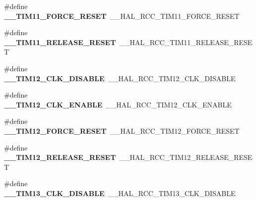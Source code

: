 \begin{DoxyCompactItemize}
\item 
\#define {\bfseries \+\_\+\+\_\+\+T\+I\+M11\+\_\+\+F\+O\+R\+C\+E\+\_\+\+R\+E\+S\+ET}~\+\_\+\+\_\+\+H\+A\+L\+\_\+\+R\+C\+C\+\_\+\+T\+I\+M11\+\_\+\+F\+O\+R\+C\+E\+\_\+\+R\+E\+S\+ET\hypertarget{group___h_a_l___r_c_c___aliased_gabd9681b9a7bba79cd54826cce394f45a}{}\label{group___h_a_l___r_c_c___aliased_gabd9681b9a7bba79cd54826cce394f45a}

\item 
\#define {\bfseries \+\_\+\+\_\+\+T\+I\+M11\+\_\+\+R\+E\+L\+E\+A\+S\+E\+\_\+\+R\+E\+S\+ET}~\+\_\+\+\_\+\+H\+A\+L\+\_\+\+R\+C\+C\+\_\+\+T\+I\+M11\+\_\+\+R\+E\+L\+E\+A\+S\+E\+\_\+\+R\+E\+S\+ET\hypertarget{group___h_a_l___r_c_c___aliased_ga824e2559156eae3f0a571246d3698431}{}\label{group___h_a_l___r_c_c___aliased_ga824e2559156eae3f0a571246d3698431}

\item 
\#define {\bfseries \+\_\+\+\_\+\+T\+I\+M12\+\_\+\+C\+L\+K\+\_\+\+D\+I\+S\+A\+B\+LE}~\+\_\+\+\_\+\+H\+A\+L\+\_\+\+R\+C\+C\+\_\+\+T\+I\+M12\+\_\+\+C\+L\+K\+\_\+\+D\+I\+S\+A\+B\+LE\hypertarget{group___h_a_l___r_c_c___aliased_gab8ee1eb9468f1037ae0b82dae47b4e36}{}\label{group___h_a_l___r_c_c___aliased_gab8ee1eb9468f1037ae0b82dae47b4e36}

\item 
\#define {\bfseries \+\_\+\+\_\+\+T\+I\+M12\+\_\+\+C\+L\+K\+\_\+\+E\+N\+A\+B\+LE}~\+\_\+\+\_\+\+H\+A\+L\+\_\+\+R\+C\+C\+\_\+\+T\+I\+M12\+\_\+\+C\+L\+K\+\_\+\+E\+N\+A\+B\+LE\hypertarget{group___h_a_l___r_c_c___aliased_gaa238e8a1840193501450360652992b0a}{}\label{group___h_a_l___r_c_c___aliased_gaa238e8a1840193501450360652992b0a}

\item 
\#define {\bfseries \+\_\+\+\_\+\+T\+I\+M12\+\_\+\+F\+O\+R\+C\+E\+\_\+\+R\+E\+S\+ET}~\+\_\+\+\_\+\+H\+A\+L\+\_\+\+R\+C\+C\+\_\+\+T\+I\+M12\+\_\+\+F\+O\+R\+C\+E\+\_\+\+R\+E\+S\+ET\hypertarget{group___h_a_l___r_c_c___aliased_gae56b393a7c3f23192414bb515d3e0ce7}{}\label{group___h_a_l___r_c_c___aliased_gae56b393a7c3f23192414bb515d3e0ce7}

\item 
\#define {\bfseries \+\_\+\+\_\+\+T\+I\+M12\+\_\+\+R\+E\+L\+E\+A\+S\+E\+\_\+\+R\+E\+S\+ET}~\+\_\+\+\_\+\+H\+A\+L\+\_\+\+R\+C\+C\+\_\+\+T\+I\+M12\+\_\+\+R\+E\+L\+E\+A\+S\+E\+\_\+\+R\+E\+S\+ET\hypertarget{group___h_a_l___r_c_c___aliased_gab3ad7993389232812fa3634cb8f7909f}{}\label{group___h_a_l___r_c_c___aliased_gab3ad7993389232812fa3634cb8f7909f}

\item 
\#define {\bfseries \+\_\+\+\_\+\+T\+I\+M13\+\_\+\+C\+L\+K\+\_\+\+D\+I\+S\+A\+B\+LE}~\+\_\+\+\_\+\+H\+A\+L\+\_\+\+R\+C\+C\+\_\+\+T\+I\+M13\+\_\+\+C\+L\+K\+\_\+\+D\+I\+S\+A\+B\+LE\hypertarget{group___h_a_l___r_c_c___aliased_gacfec356657ad501040bd9429cbdaa07f}{}\label{group___h_a_l___r_c_c___aliased_gacfec356657ad501040bd9429cbdaa07f}


\end{DoxyCompactItemize}
